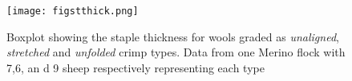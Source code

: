 %

\begin{figure}[!h]
  \centering
  \texttt{[image: figstthick.png]}
  \caption{Boxplot showing the staple thickness for wools graded as {\em unaligned}, {\em stretched} and {\em unfolded} crimp types. Data from one Merino flock with 7,6, an d 9 sheep respectively representing each type}
  \label{fig:stthick}
\end{figure}

%

